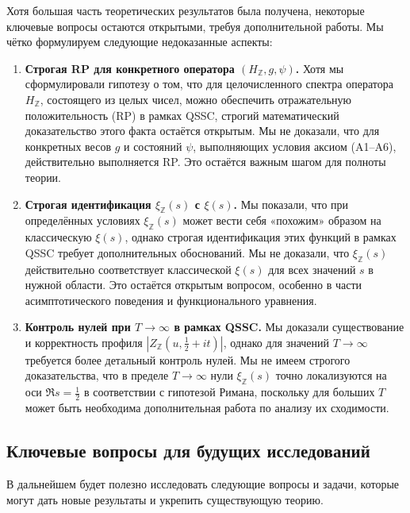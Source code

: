 \documentclass{article}
\numberwithin{equation}{section}
\theoremstyle{plain}
\theoremstyle{definition}
\theoremstyle{remark}
\def\infty{∞}\def\partial{∂}\def\sum{Σ}\def\int{∫}%
\begin{document}
\noindent
Хотя большая часть теоретических результатов была получена, некоторые ключевые вопросы остаются открытыми, требуя дополнительной работы. Мы чётко формулируем следующие недоказанные аспекты:

\begin{enumerate}[label=(\arabic*)]
    \item \textbf{Строгая RP для конкретного оператора \( (H_{\mathbb{Z}}, g, \psi) \).}
    \noindent
    Хотя мы сформулировали гипотезу о том, что для целочисленного спектра оператора \( H_{\mathbb{Z}} \), состоящего из целых чисел, можно обеспечить отражательную положительность (RP) в рамках QSSC, строгий математический доказательство этого факта остаётся открытым. Мы не доказали, что для конкретных весов \( g \) и состояний \( \psi \), выполняющих условия аксиом (A1–A6), действительно выполняется RP. Это остаётся важным шагом для полноты теории.
    
    \item \textbf{Строгая идентификация \( \xi_{\mathbb{Z}}(s) \) с \( \xi(s) \).}
    \noindent
    Мы показали, что при определённых условиях \( \xi_{\mathbb{Z}}(s) \) может вести себя «похожим» образом на классическую \( \xi(s) \), однако строгая идентификация этих функций в рамках QSSC требует дополнительных обоснований. Мы не доказали, что \( \xi_{\mathbb{Z}}(s) \) действительно соответствует классической \( \xi(s) \) для всех значений \( s \) в нужной области. Это остаётся открытым вопросом, особенно в части асимптотического поведения и функционального уравнения.
    
    \item \textbf{Контроль нулей при \( T \to \infty \) в рамках QSSC.}
    \noindent
    Мы доказали существование и корректность профиля \( |Z_{\mathbb{Z}}(u, \frac{1}{2} + it)| \), однако для значений \( T \to \infty \) требуется более детальный контроль нулей. Мы не имеем строгого доказательства, что в пределе \( T \to \infty \) нули \( \xi_{\mathbb{Z}}(s) \) точно локализуются на оси \( \Re s = \frac{1}{2} \) в соответствии с гипотезой Римана, поскольку для больших \( T \) может быть необходима дополнительная работа по анализу их сходимости.
\end{enumerate}

\subsection{Ключевые вопросы для будущих исследований}
\label{subsec:future-questions}

\noindent
В дальнейшем будет полезно исследовать следующие вопросы и задачи, которые могут дать новые результаты и укрепить существующую теорию.
\end{document}
